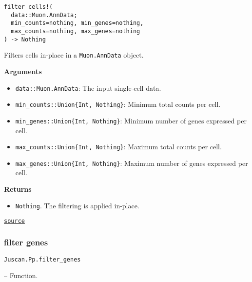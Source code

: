 \documentclass[oneside]{memoir}
\begin{document}
\begin{adjustwidth}{2em}{0pt}


\begin{verbatim}
filter_cells!(
  data::Muon.AnnData;
  min_counts=nothing, min_genes=nothing,
  max_counts=nothing, max_genes=nothing
) -> Nothing
\end{verbatim}

Filters cells in-place in a \texttt{Muon.AnnData} object.

\textbf{Arguments}

\begin{itemize}
\item \texttt{data::Muon.AnnData}: The input single-cell data.


\item \texttt{min\_counts::Union\{Int, Nothing\}}: Minimum total counts per cell.


\item \texttt{min\_genes::Union\{Int, Nothing\}}: Minimum number of genes expressed per cell.


\item \texttt{max\_counts::Union\{Int, Nothing\}}: Maximum total counts per cell.


\item \texttt{max\_genes::Union\{Int, Nothing\}}: Maximum number of genes expressed per cell.

\end{itemize}
\textbf{Returns}

\begin{itemize}
\item \texttt{Nothing}. The filtering is applied in-place.

\end{itemize}


\href{https://github.com/zehua0417/Juscan.jl/blob/393ad1b827b678ea98a738f92af658ee9ed9a403/src/preprocessing/filter.jl#L148-L166}{\texttt{source}}


\end{adjustwidth}

\subsubsection{filter genes}



\label{345608345551185906}{}

\hypertarget{8931327722432789847}{\texttt{Juscan.Pp.filter\_genes}}  -- {Function.}
\end{document}
